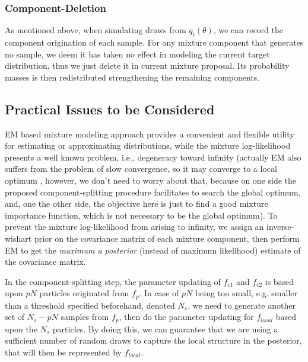 \subsubsection{Component-Deletion} \label{sec:deletion}
As mentioned above, when simulating draws from $q_t(\theta)$, we can
record the component origination of each sample. For any mixture
component that generates no sample, we deem it has taken no effect
in modeling the current target distribution, thus we just delete it
in current mixture proposal. Its probability masses is then
redistributed strengthening the remaining components.

\subsection{Practical Issues to be Considered}
EM based mixture modeling approach provides a convenient and
flexible utility for estimating or approximating distributions,
while the mixture log-likelihood presents a well known problem,
i.e., degeneracy toward infinity \citep{biernacki2003degeneracy}
(actually EM also suffers from the problem of slow convergence, so
it may converge to a local optimum \citep{biernacki2003degeneracy},
however, we don't need to worry about that, because on one side the
proposed component-splitting procedure facilitates to search the
global optimum, and, one the other side, the objective here is just
to find a good mixture importance function, which is not necessary
to be the global optimum). To prevent the mixture log-likelihood
from arising to infinity, we assign an inverse-wishart prior on the
covariance matrix of each mixture component, then perform EM to get
the \emph{maximum a posterior} (instead of maximum likelihood)
estimate of the covariance matrix.

In the component-splitting step, the parameter updating of $f_{c1}$
and $f_{c2}$ is based upon $pN$ particles originated from $f_p$. In
case of $pN$ being too small, e.g. smaller than a threshold
specified beforehand, denoted $N_s$, we need to generate another set
of $N_s-pN$ samples from $f_p$, then do the parameter updating for
$f_{local}$ based upon the $N_s$ particles. By doing this, we can
guarantee that we are using a sufficient number of random draws to
capture the local structure in the posterior, that will then be
represented by $f_{local}$.

